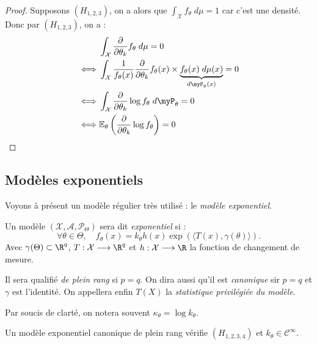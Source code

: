 \begin{proof}
    Supposons $(H_{1, 2, 3})$, on a alors que $ \int_\mathcal{X} f_\theta \; d \mu = 1$ car c'est une densité. 
    Donc par $(H_{1, 2, 3})$, on a : 
        \begin{align*}
            & \int_\mathcal{X} \frac{ \partial}{ \partial \theta_k} f_\theta \; d \mu = 0 \\ 
            \iff & \int_\mathcal{X} \frac{1}{f_\theta(x)} \frac{\partial}{\partial \theta_k} f_\theta(x) \times 
                \underbrace{ f_\theta(x) \; d \mu(x)}_{d \myP_\theta(x)} = 0 \\ 
            \iff & \int_\mathcal{X} \frac{ \partial }{\partial \theta_k} \log f_\theta \; d \myP_\theta = 0 \\ 
            \iff & \mathbb{E}_\theta \left( \frac{\partial}{\partial \theta_k} \log f_\theta \right) = 0 
        \end{align*}
\end{proof}

\subsection{Modèles exponentiels}

Voyons à présent un modèle régulier très utilisé : le \emph{modèle exponentiel}. 

\begin{definition}
    Un modèle $( \mathcal{X}, \mathcal{A}, \mathcal{P}_\Theta)$ sera dit \emph{exponentiel} si : 
        $$ \boxed{\forall \theta \in \Theta, \quad f_\theta(x) = k_\theta h(x) \exp \left( \langle T(x), \gamma(\theta) \rangle\right).} $$
    Avec $ \gamma( \Theta) \subset \R^q$, $T : \mathcal{X} \longrightarrow \R^q$ et 
    $h : \mathcal{X} \longrightarrow \R$ la fonction de changement de mesure. 

    Il sera qualifié \emph{de plein rang} si $p=q$. On dira aussi qu'il est \emph{canonique} sir $ p=q$ et 
    $ \gamma$ est l'identité. On appellera enfin $T(X)$ la \emph{statistique privilégiée du modèle}. 

    Par soucis de clarté, on notera souvent $ \kappa_\theta = \log k_\theta$. 
\end{definition}

\begin{theorem}[Régularité]
    Un modèle exponentiel canonique de plein rang vérifie $(H_{1, 2, 3, 4})$ et $ k_\theta \in \mathcal{C}^\infty$.
\end{theorem}

